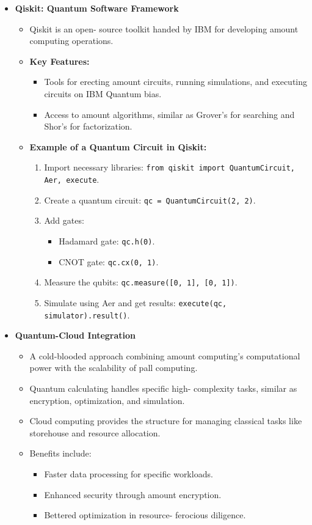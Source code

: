 \documentclass[conference]{IEEEtran}
\begin{document}
\begin{itemize}
    \item \textbf{Qiskit: Quantum Software Framework}
    \begin{itemize}
        \item Qiskit is an open- source toolkit handed by IBM for developing amount computing operations.
        \item \textbf{Key Features:}
        \begin{itemize}
            \item Tools for erecting amount circuits, running simulations, and executing circuits on IBM Quantum bias.
            \item Access to amount algorithms, similar as Grover's for searching and Shor's for factorization.
        \end{itemize}
        \item \textbf{Example of a Quantum Circuit in Qiskit:}
        \begin{enumerate}
            \item Import necessary libraries: \texttt{from qiskit import QuantumCircuit, Aer, execute}.
            \item Create a quantum circuit: \texttt{qc = QuantumCircuit(2, 2)}.
            \item Add gates:
            \begin{itemize}
                \item Hadamard gate: \texttt{qc.h(0)}.
                \item CNOT gate: \texttt{qc.cx(0, 1)}.
            \end{itemize}
            \item Measure the qubits: \texttt{qc.measure([0, 1], [0, 1])}.
            \item Simulate using Aer and get results: \texttt{execute(qc, simulator).result()}.
        \end{enumerate}
    \end{itemize}

    \item \textbf{Quantum-Cloud Integration}
    \begin{itemize}
        \item A cold-blooded approach combining amount computing's computational power with the scalability of pall computing.
        \item Quantum calculating handles specific high- complexity tasks, similar as encryption, optimization, and simulation.
        \item Cloud computing provides the structure for managing classical tasks like storehouse and resource allocation.
        \item Benefits include:
        \begin{itemize}
            \item Faster data processing for specific workloads.
             \item Enhanced security through amount encryption.
              \item Bettered optimization in resource- ferocious diligence.
        \end{itemize}
    \end{itemize}


\end{itemize}
\end{document}
